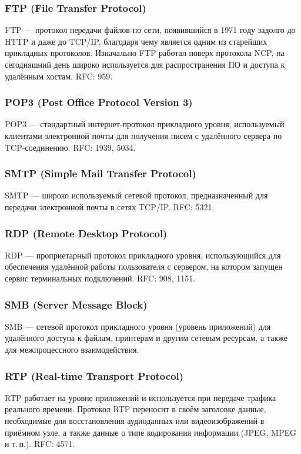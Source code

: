 \subsubsection{FTP (File Transfer Protocol)}
FTP — протокол передачи файлов по сети, появившийся в 1971 году задолго до HTTP и
даже до TCP/IP, благодаря чему является одним из старейших прикладных протоколов.
Изначально FTP работал поверх протокола NCP, на сегодняшний день широко используется
для распространения ПО и доступа к удалённым хостам. RFC: 959.

\subsubsection{POP3 (Post Office Protocol Version 3)}
POP3 — стандартный интернет-протокол прикладного уровня, используемый клиентами
электронной почты для получения писем с удалённого сервера по TCP-соединению.
RFC: 1939, 5034.

\subsubsection{SMTP (Simple Mail Transfer Protocol)}
SMTP — широко используемый сетевой протокол, предназначенный для передачи
электронной почты в сетях TCP/IP. RFC: 5321.

\subsubsection{RDP (Remote Desktop Protocol)}
RDP — проприетарный протокол прикладного уровня, использующийся для обеспечения
удалённой работы пользователя с сервером, на котором запущен сервис терминальных
подключений. RFC: 908, 1151.

\subsubsection{SMB (Server Message Block)}
SMB — сетевой протокол прикладного уровня (уровень приложений) для удалённого
доступа к файлам, принтерам и другим сетевым ресурсам, а также для межпроцессного
взаимодействия.

\subsubsection{RTP (Real-time Transport Protocol)}
RTP работает на уровне приложений и используется при передаче трафика реального
времени. Протокол RTP переносит в своём заголовке данные, необходимые для
восстановления аудиоданных или видеоизображений в приёмном узле, а также данные о типе
кодирования информации (JPEG, MPEG и т.\,п.). RFC: 4571.

